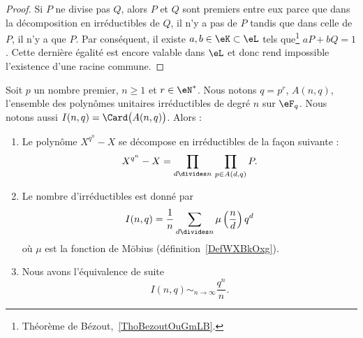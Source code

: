 \begin{proof}
	Si \( P\) ne divise pas \( Q\), alors \( P\) et \( Q\) sont premiers entre eux parce que dans la décomposition en irréductibles de \( Q\), il n'y a pas de \( P\) tandis que dans celle de \( P\), il n'y a que \( P\). Par conséquent, il existe \( a,b\in \eK\subset\eL\) tels que\footnote{Théorème de Bézout,~\ref{ThoBezoutOuGmLB}.} \( aP+bQ=1\). Cette dernière égalité est encore valable dans \( \eL\) et donc rend impossible l'existence d'une racine commune.
\end{proof}

\begin{proposition} \label{PropVFNOvzZ}
	Soit \( p\) un nombre premier, \( n\geq 1\) et \( r\in \eN^*\). Nous notons \( q=p^r\), \( A(n,q)\), l'ensemble des polynômes unitaires irréductibles de degré \( n\) sur \( \eF_q\). Nous notons aussi \( I(n,q)=\Card\big( A(n,q) \big)\). Alors :
	\begin{enumerate}
		\item
		      Le polynôme \( X^{q^n}-X\) se décompose en irréductibles de la façon suivante :
		      \begin{equation}
			      X^{q^n}-X=\prod_{d\divides n}\,\prod_{p\in A(d,q)}P.
		      \end{equation}
		\item
		      Le nombre d'irréductibles est donné par
		      \begin{equation}
			      I(n,q)=\frac{1}{ n }\sum_{d\divides n}\mu\left( \frac{ n }{ d } \right)q^d
		      \end{equation}
		      où \( \mu\) est la fonction de Möbius (définition~\ref{DefWXBkOxg}).
		\item
		      Nous avons l'équivalence de suite
		      \begin{equation}
			      I(n,q)\sim_{n\to\infty}\frac{ q^n }{ n }.
		      \end{equation}
	\end{enumerate}
\end{proposition}

